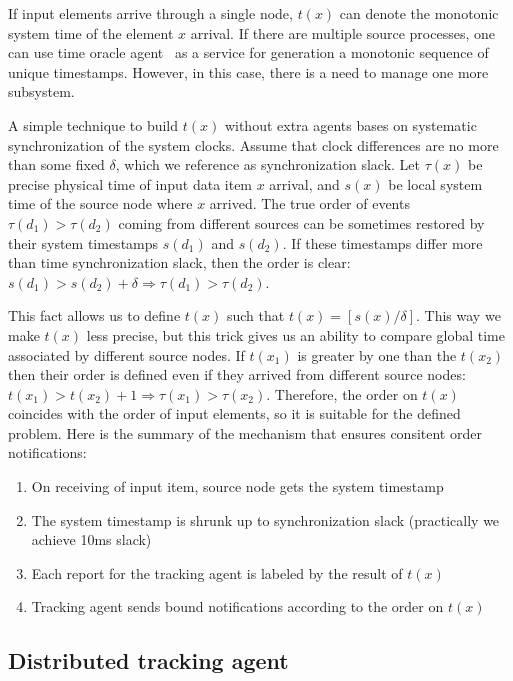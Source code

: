 If input elements arrive through a single node, $t(x)$ can denote the monotonic system time of the element $x$ arrival. If there are multiple source processes, one can use time oracle agent~\cite{10.14778/3055330.3055335} as a service for generation a monotonic sequence of unique timestamps. However, in this case, there is a need to manage one more subsystem.

A simple technique to build $t(x)$ without extra agents bases on systematic synchronization of the system clocks. Assume that clock differences are no more than some fixed $\delta$, which we reference as synchronization slack. Let $\tau(x)$ be precise physical time of input data item $x$ arrival, and $s(x)$ be local system time of the source node where $x$ arrived. The true order of events $\tau(d_1) > \tau(d_2)$ coming from different sources can be sometimes restored by their system timestamps $s(d_1)$ and $s(d_2)$. If these timestamps differ more than time synchronization slack, then the order is clear: $s(d_1) > s(d_2) + \delta \Rightarrow \tau(d_1) > \tau(d_2)$.

This fact allows us to define $t(x)$ such that $t(x) = [s(x) / \delta]$. This way we make $t(x)$ less precise, but this trick gives us an ability to compare global time associated by different source nodes. If $t(x_1)$ is greater by one than the $t(x_2)$ then their order is defined even if they arrived from different source nodes:  $t(x_1) > t(x_2) + 1 \Rightarrow \tau(x_1) > \tau(x_2)$. Therefore, the order on $t(x)$ coincides with the order of input elements, so it is suitable for the defined problem. Here is the summary of the mechanism that ensures consitent order notifications:
\begin{enumerate}
    \item On receiving of input item, source node gets the system timestamp
    \item The system timestamp is shrunk up to synchronization slack (practically we achieve 10ms slack)
    \item Each report for the tracking agent is labeled by the result of $t(x)$
    \item Tracking agent sends bound notifications according to the order on $t(x)$
\end{enumerate}

\subsection{Distributed tracking agent}

